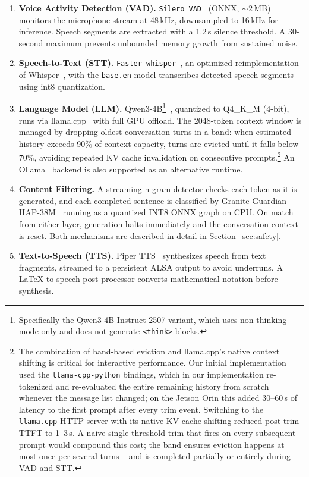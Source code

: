 \documentclass[11pt]{article}
\begin{document}
\begin{enumerate}[nosep]
  \item \textbf{Voice Activity Detection (VAD).}
    \texttt{Silero VAD}~\cite{silero_vad} (ONNX, ${\sim}2$\,MB) monitors the microphone stream at 48\,kHz,
    downsampled to 16\,kHz for inference.
    Speech segments are extracted with a 1.2\,s silence threshold.
    A 30-second maximum prevents unbounded memory growth from sustained noise.
  \item \textbf{Speech-to-Text (STT).}
    \texttt{Faster-whisper}~\cite{faster_whisper}, an optimized reimplementation of Whisper~\cite{radford2023whisper},
    with the \texttt{base.en} model transcribes detected speech segments using int8 quantization.
  \item \textbf{Language Model (LLM).}
    Qwen3-4B\footnote{Specifically the Qwen3-4B-Instruct-2507 variant, which uses non-thinking mode only and does not generate \texttt{<think>} blocks.}~\cite{yang2025qwen3},
    quantized to Q4\_K\_M (4-bit), runs via llama.cpp~\cite{llamacpp_python} with full GPU offload.
    The 2048-token context window is managed by dropping oldest conversation turns in a band:
    when estimated history exceeds 90\% of context capacity, turns are evicted until it falls below 70\%,
    avoiding repeated KV cache invalidation on consecutive prompts.\footnote{%
      The combination of band-based eviction and llama.cpp's native context shifting is critical for interactive performance.
      Our initial implementation used the \texttt{llama-cpp-python} bindings,
      which in our implementation re-tokenized and re-evaluated the entire remaining history from scratch whenever the message list changed;
      on the Jetson Orin this added 30--60\,s of latency to the first prompt after every trim event.
      Switching to the \texttt{llama.cpp} HTTP server with its native KV cache shifting reduced post-trim TTFT to 1--3\,s.
      A naive single-threshold trim that fires on every subsequent prompt would compound this cost;
      the band ensures eviction happens at most once per several turns -- and is completed partially or entirely during VAD and STT.%
    }
    An Ollama~\cite{ollama} backend is also supported as an alternative runtime.
  \item \textbf{Content Filtering.}
    A streaming n-gram detector checks each token as it is generated,
    and each completed sentence is classified by Granite Guardian HAP-38M~\cite{padhi2024graniteguardian} running as a quantized INT8 ONNX graph on CPU.
    On match from either layer, generation halts immediately and the conversation context is reset.
    Both mechanisms are described in detail in Section~\ref{sec:safety}.
  \item \textbf{Text-to-Speech (TTS).}
    Piper TTS~\cite{piper_tts} synthesizes speech from text fragments,
    streamed to a persistent ALSA output to avoid underruns.
    A LaTeX-to-speech post-processor converts mathematical notation before synthesis.
\end{enumerate}
\end{document}
